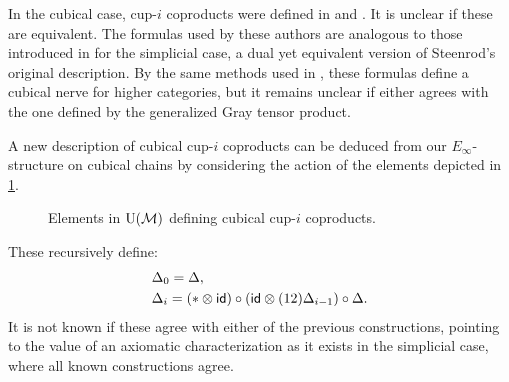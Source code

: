 In the cubical case, cup-$i$ coproducts were defined in \cite{kadeishvili1999coproducts} and \cite{pilarczyk2016cubical}.
It is unclear if these are equivalent.
The formulas used by these authors are analogous to those introduced in \cite{medina2021fast_sq} for the simplicial case, a dual yet equivalent version of Steenrod's original description.
By the same methods used in \cite{medina2020globular}, these formulas define a cubical nerve for higher categories, but it remains unclear if either agrees with the one defined by the generalized Gray tensor product.

A new description of cubical cup-$i$ coproducts can be deduced from our $E_\infty$-structure on cubical chains by considering the action of the elements depicted in \cref{f:cup-i}.
\begin{figure}
	\centering
	\caption{Elements in ${\operatorname{U}(\mathcal{M})}$ defining cubical cup-$i$ coproducts.}
	\label{f:cup-i}
\end{figure}
These recursively define:
\begin{equation} \label{e:prop cup-i}
	\begin{split}
		& \Delta_0 = \Delta, \\
		& \Delta_i =
		(\ast \otimes \mathsf{id}) \circ (\mathsf{id} \otimes (12) \Delta_{i-1}) \circ \Delta.
	\end{split}
\end{equation}
It is not known if these agree with either of the previous constructions, pointing to the value of an axiomatic characterization as it exists in the simplicial case, where all known constructions agree.

